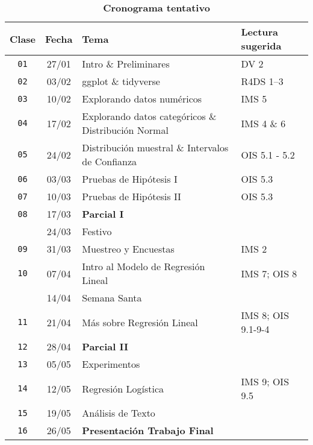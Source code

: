 \documentclass[10pt]{article}
\newcommand{\ra}[1]{\renewcommand{\arraystretch}{#1}}
\begin{document}
	\begin{table}[htb]
		\centering
		\caption*{\textbf{Cronograma tentativo}}
		\ra{1.5}
		\begin{tabular}{@{\extracolsep{1cm}} c c l l @{}}
			\toprule
			\textbf{Clase} & \textbf{Fecha} & \textbf{Tema} & \textbf{Lectura sugerida}  \\ \toprule
			\texttt{01} & 27/01 & Intro \& Preliminares & DV 2 \\
			\texttt{02} & 03/02 & ggplot \& tidyverse & R4DS 1--3 \\
			\texttt{03} & 10/02 & Explorando datos numéricos & IMS 5 \\
			\texttt{04} & 17/02 & Explorando datos categóricos \& Distribución Normal & IMS 4 \& 6
			\\
			\texttt{05} & 24/02 & Distribución muestral \& Intervalos de Confianza & OIS 5.1 - 5.2 \\
			\texttt{06} & 03/03 & Pruebas de Hipótesis I & OIS 5.3 \\
			\texttt{07} & 10/03 & Pruebas de Hipótesis II & OIS 5.3 \\ \midrule
			\texttt{08} & 17/03 & \textbf{Parcial I} &   \\ \midrule
			& 24/03 & Festivo &   \\
			\texttt{09} & 31/03 & Muestreo y Encuestas & IMS 2  \\
			\texttt{10} & 07/04 & Intro al Modelo de Regresión Lineal & IMS 7; OIS 8 \\ 
			& 14/04 & Semana Santa & \\ 
			\texttt{11} & 21/04 & Más sobre Regresión Lineal & IMS 8; OIS 9.1-9-4 \\ \midrule
			\texttt{12} & 28/04 & \textbf{Parcial II} &   \\ \midrule
			\texttt{13} & 05/05 & Experimentos &  \\
			\texttt{14} & 12/05 & Regresión Logística & IMS 9; OIS 9.5 \\
			\texttt{15} & 19/05 & Análisis de Texto &  \\
			\texttt{16} & 26/05 & \textbf{Presentación Trabajo Final} &   \\ 
			\bottomrule
		\end{tabular}
	\end{table}
	
	
\end{document}
